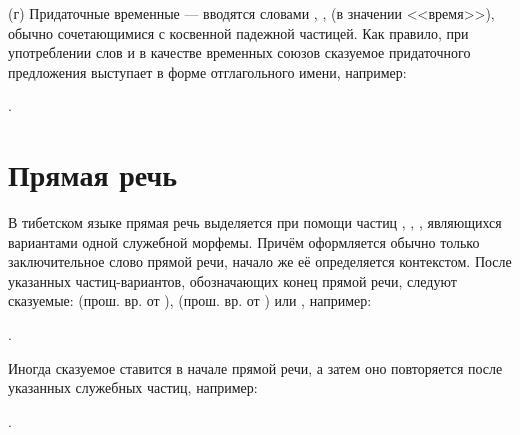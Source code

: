 (г) Придаточные временные --- вводятся словами
, ,  (в значении <<время>>), обычно сочетающимися с косвенной падежной частицей. Как правило, при употреблении слов  и  в качестве временных союзов сказуемое придаточного предложения выступает в форме отглагольного имени, например:
\begin{prfsample}
	\item {}.
\end{prfsample}

\section{Прямая речь}

В тибетском языке прямая речь выделяется при помощи частиц , , , являющихся вариантами одной служебной морфемы. Причём оформляется обычно только заключительное слово прямой речи, начало же её определяется контекстом. После указанных частиц-вариантов, обозначающих конец прямой речи, следуют сказуемые:
 (прош. вр. от ),
 (прош. вр. от ) или
, например:
\begin{prfsample}
	\item {}.
\end{prfsample}

Иногда сказуемое  ставится в начале прямой речи, а затем оно повторяется после указанных служебных частиц, например:
\begin{prfsample}
	\item {}.
\end{prfsample}

